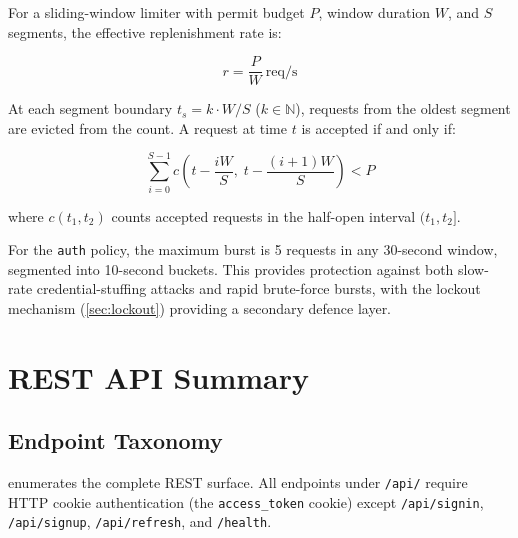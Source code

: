 \documentclass[12pt,a4paper]{article}
\theoremstyle{definition}
\theoremstyle{plain}
\theoremstyle{remark}
\newcommand{\N}{\mathbb{N}}
\begin{document}
For a sliding-window limiter with permit budget $P$, window duration
$W$, and $S$ segments, the effective replenishment rate is:

\begin{equation}
  r = \frac{P}{W}\ \text{req/s}
  \label{eq:rate_replenishment}
\end{equation}

At each segment boundary $t_s = k \cdot W / S$ ($k \in \N$), requests
from the oldest segment are evicted from the count. A request at time $t$
is accepted if and only if:

\begin{equation}
  \sum_{i=0}^{S-1}
    c\!\left(t - \frac{iW}{S},\; t - \frac{(i+1)W}{S}\right)
  < P
  \label{eq:sliding_window}
\end{equation}

where $c(t_1, t_2)$ counts accepted requests in the half-open interval
$(t_1, t_2]$.

For the \texttt{auth} policy, the maximum burst is 5 requests in any
30-second window, segmented into 10-second buckets. This provides
protection against both slow-rate credential-stuffing attacks and rapid
brute-force bursts, with the lockout mechanism (\cref{sec:lockout})
providing a secondary defence layer.

\section{REST API Summary}
\label{sec:api}

\subsection{Endpoint Taxonomy}

 enumerates the complete REST surface. All
endpoints under \texttt{/api/} require HTTP cookie authentication (the
\texttt{access\_token} cookie) except \texttt{/api/signin},
\texttt{/api/signup}, \texttt{/api/refresh}, and \texttt{/health}.
\end{document}
